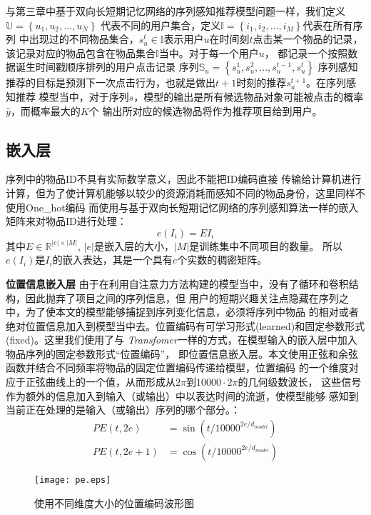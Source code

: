 与第三章中基于双向长短期记忆网络的序列感知推荐模型问题一样，我们定义$\mathbb{U}= \left \{ u_{1},u_{2},...,u_{N} \right \}\label{eq}$%
代表不同的用户集合，定义$\mathbb{I}= \left \{ i_{1},i_{2},...,i_{M} \right \}$代表在所有序列%
中出现过的不同物品集合，$s_{u}^{t}\in \mathbb{I}$表示用户$u$在时间刻$t$点击某一个物品的记录，%
该记录对应的物品包含在物品集合$\mathbb{I}$当中。对于每一个用户$u$，%
都记录一个按照数据诞生时间戳顺序排列的用户点击记录%
序列$\mathbb{S}_{u}=\left \{ s_{u}^{1},s_{u}^{2},...,s_{u}^{t-1},s_{u}^{t} \right \}$%
序列感知推荐的目标是预测下一次点击行为，也就是做出$t+1$时刻的推荐$s_{u}^{t+1}$。在序列感知推荐%
模型当中，对于序列$s$，模型的输出是所有候选物品对象可能被点击的概率$\hat{y}$，而概率最大的$K$个%
输出所对应的候选物品将作为推荐项目给到用户。%

\subsection{嵌入层}

序列中的物品ID不具有实际数学意义，因此不能把ID编码直接%
传输给计算机进行计算，但为了使计算机能够以较少的资源消耗而感知不同的物品身份，这里同样不使用One\_hot编码%
而使用与基于双向长短期记忆网络的序列感知算法一样的嵌入矩阵来对物品ID进行处理：
$$
e(I_i) = EI_i
$$
其中$E\in \mathbb{R}^{|e|\times |M|}$, $|e|$是嵌入层的大小，$|M|$是训练集中不同项目的数量。%
所以$e(I_i)$是$I_i$的嵌入表达，其是一个具有$e$个实数的稠密矩阵。

\textbf{位置信息嵌入层}
由于在利用自注意力方法构建的模型当中，没有了循环和卷积结构，因此抛弃了项目之间的序列信息，但%
用户的短期兴趣关注点隐藏在序列之中，为了使本文的模型能够捕捉到序列变化信息，必须将序列中物品%
的相对或者绝对位置信息加入到模型当中去。位置编码有可学习形式(learned)和固定参数形式%
(fixed)。这里我们使用了与%
\textit{Transfomer}一样的方式，在模型输入的嵌入层中加入物品序列的固定参数形式“位置编码”，%
即位置信息嵌入层。本文使用正弦和余弦函数并结合不同频率将物品的固定位置编码传递给模型，位置编码%
的一个维度对应于正弦曲线上的一个值，从而形成从$2\pi $到$10000 \cdot  2\pi$的几何级数波长，%
这些信号作为额外的信息加入到输入（或输出）中以表达时间的流逝，使模型能够%
感知到当前正在处理的是输入（或输出）序列的哪个部分。：
\begin{align}
  PE(t,2e) &= \sin (t/10000^{2e/d_{model}}) \label{eq:sin}\\
  PE(t,2e+1) &= \cos (t/10000^{2e/d_{model}}) \label{con}
\end{align}
\begin{figure}
\centering
\texttt{[image: pe.eps]}
\caption{使用不同维度大小的位置编码波形图}
\label{fig:pe}
\end{figure}

